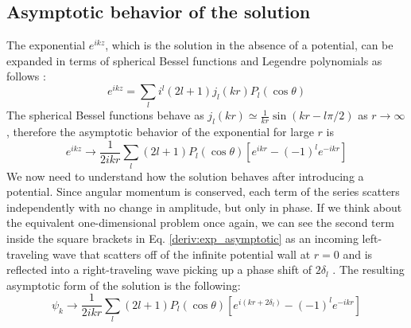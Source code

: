 \subsection{Asymptotic behavior of the solution}
The exponential \(e^{ikz} \), which is the solution in the absence of a potential, can be expanded in terms of spherical Bessel functions and Legendre polynomials as follows \cite{cohen-tannoudji}:
\begin{equation}
	e^{ikz} = \sum_{l} i^l (2l+1) j_l(kr)P_l(\cos \theta )
\end{equation}
The spherical Bessel functions behave as \(j_l(kr) \simeq \frac{1}{kr} \sin \left(kr - l \pi /2\right)\) as \(r \to \infty \), therefore the asymptotic behavior of the exponential for large \(r\) is
\begin{equation}\label{deriv:exp_asymptotic}
	e^{ikz} \to  \frac{1}{2ikr} \sum_{l} (2l+1) P_l (\cos \theta ) \left[ e^{ikr}  - (-1)^l e^{-ikr} \right]
\end{equation}
We now need to understand how the solution behaves after introducing a potential. Since angular momentum is conserved, each term of the series scatters independently with no change in amplitude, but only in phase. If we think about the equivalent one-dimensional problem once again, we can see the second term inside the square brackets in Eq. \eqref{deriv:exp_asymptotic} as an incoming left-traveling wave that scatters off of the infinite potential wall at \(r=0\) and is reflected into a right-traveling wave picking up a phase shift of \(2\delta _l\) \cite{griffiths}. The resulting asymptotic form of the solution is the following:
\begin{equation}\label{deriv:sol_asymptotic}
	\psi_k \to \frac{1}{2ikr}\sum_{l} (2l+1)P_l(\cos \theta )\left[e^{i(kr+2\delta _l)}- (-1)^l e^{-ikr}  \right]
\end{equation}

